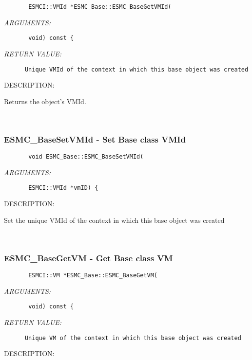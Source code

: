   
\begin{verbatim}       ESMCI::VMId *ESMC_Base::ESMC_BaseGetVMId(\end{verbatim}{\em ARGUMENTS:}
\begin{verbatim}       void) const {\end{verbatim}{\em RETURN VALUE:}
\begin{verbatim}      Unique VMId of the context in which this base object was created\end{verbatim}
{\sf DESCRIPTION:\\ }


      Returns the object's VMId.
   
 
\mbox{}\hrulefill\
 
\subsubsection [ESMC\_BaseSetVMId] {ESMC\_BaseSetVMId - Set Base class VMId}


  
\begin{verbatim}       void ESMC_Base::ESMC_BaseSetVMId(\end{verbatim}{\em ARGUMENTS:}
\begin{verbatim}       ESMCI::VMId *vmID) {\end{verbatim}
{\sf DESCRIPTION:\\ }


      Set the unique VMId of the context in which this base object was created
   
 
\mbox{}\hrulefill\
 
\subsubsection [ESMC\_BaseGetVM] {ESMC\_BaseGetVM - Get Base class VM}


  
\begin{verbatim}       ESMCI::VM *ESMC_Base::ESMC_BaseGetVM(\end{verbatim}{\em ARGUMENTS:}
\begin{verbatim}       void) const {\end{verbatim}{\em RETURN VALUE:}
\begin{verbatim}      Unique VM of the context in which this base object was created\end{verbatim}
{\sf DESCRIPTION:\\ }


